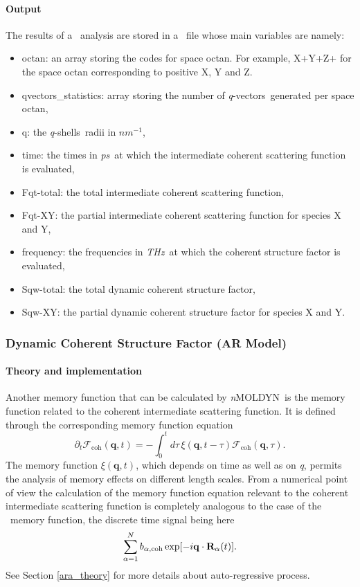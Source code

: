\documentclass[a4paper,11pt]{report}
\newcommand{\ps}{\textit{ps}}
\newcommand{\invnm}{$nm^{-1}$}
\newcommand{\thz}{\textit{THz}}
\newcommand{\qval}{\textit{q}}
\newcommand{\qvects}{\textit{q}-vectors}
\newcommand{\qshells}{\textit{q}-shells}
\newcommand{\NMOLDYN}{\textit{n}MOLDYN}
\begin{document}
\paragraph{Output\\}
The results of a \DCSF\ analysis are stored in a \NetCDF\ file whose main variables are namely:
\begin{itemize}
\item octan: an array storing the codes for space octan. For example, X+Y+Z+ for the space octan corresponding to positive
X, Y and Z.
\item qvectors\_statistics: array storing the number of \qvects\ generated per space octan,
\item q: the \qshells\ radii in \invnm ,
\item time: the times in \ps\ at which the intermediate coherent scattering function is evaluated,
\item Fqt-total: the total intermediate coherent scattering function,
\item Fqt-XY: the partial intermediate coherent scattering function for species X and Y,
\item frequency: the frequencies in \thz\ at which the coherent structure factor is evaluated,
\item Sqw-total: the total dynamic coherent structure factor,
\item Sqw-XY: the partial dynamic coherent structure factor for species X and Y.
\end{itemize}

\subsubsection{Dynamic Coherent Structure Factor (AR Model)}
\label{dcsfar}
\paragraph{Theory and implementation\\}
\label{dcsfar_theory}
Another memory function that can be calculated by \NMOLDYN\ is the memory function related to the coherent intermediate 
scattering function. It is defined through the corresponding memory function equation
\begin{equation}
\label{eq:mem_fcoh}
\partial_t{\mathcal{F}} _{\mathrm{coh}}(\mathbf{q},t) =
-\int_{0}^{t} d\tau\,\xi(\mathbf{q},t-\tau){\mathcal{F} _{\mathrm{coh}}}(\mathbf{q},\tau) \mbox{.}
\end{equation}
The memory function $\xi(\mathbf{q},t)$, which depends on time as well as on \qval, permits the analysis of memory effects on 
different length scales. From a numerical point of view the calculation of the memory function equation relevant to the coherent 
intermediate scattering function is completely analogous to the case of the \VACF\ memory function, the discrete
time signal being here
\begin{equation}
\sum_{\alpha=1}^N b_{\alpha,\mathrm{coh}}\exp[-i{\bf q}\cdot{\bf R}_\alpha(t)].
\end{equation}
See Section \ref{ara_theory} for more details about auto-regressive process.
\end{document}
